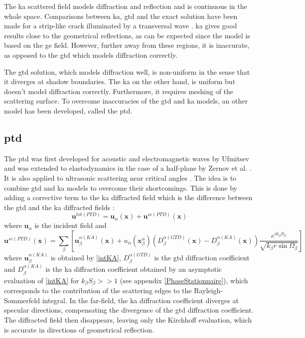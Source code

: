 The \acrshort{ka} scattered field models diffraction and reflection and is continuous in the whole space. Comparisons between \acrshort{ka}, \acrshort{gtd} and the exact solution have been made for a strip-like crack illuminated by a transversal wave \cite{POChapman,systmodel}. \acrshort{ka} gives good results close to the geometrical reflections, as can be expected since the model is based on the \acrshort{ge} field. However, further away from these regions, it is inaccurate, as opposed to the \acrshort{gtd} which models diffraction correctly.

The \acrshort{gtd} solution, which models diffraction well, is non-uniform in the sense that it diverges at shadow boundaries. The \acrshort{ka} on the other hand, is uniform but doesn't model diffraction correctly. Furthermore, it requires meshing of the scattering surface. To overcome inaccuracies of the \acrshort{gtd} and \acrshort{ka} models, an other model has been developed, called the \acrfull{ptd}.

\subsection{\acrfull{ptd}}
The \acrfull{ptd} was first developed for acoustic and electromagnetic waves by Ufmitsev \cite{Ufmi} and was extended to elastodynamics in the case of a half-plane by Zernov et al. \cite{Zernov}. It is also applied to ultrasonic scattering near critical angles \cite{systmodel,FradkinDarmon}. The idea is to combine \acrshort{gtd} and \acrshort{ka} models to overcome their shortcomings. This is done by adding a corrective term to the \acrshort{ka} diffracted field which is the difference between the \acrshort{gtd} and the \acrshort{ka} diffracted fields :
\begin{equation}
\mathbf{u}^{tot (PTD)}=\mathbf{u}_{\alpha}(\mathbf{x})+\mathbf{u}^{sc (PTD)}(\mathbf{x})
\end{equation}
where $\mathbf{u}_{\alpha}$ is the incident field and
\begin{equation}
\mathbf{u}^{sc (PTD)}(\mathbf{x})=\sum_{\beta}\left[\mathbf{u}^{\alpha(KA)}_{\beta}(\mathbf{x})+u_{\alpha}(\mathbf{x}_{\beta}^{\alpha})\left(D_{\beta}^{\alpha(GTD)}(\mathbf{x})-D_{\beta}^{\alpha(KA)}(\mathbf{x})\right)\dfrac{e^{ik_{\beta}S_{\beta}}}{\sqrt{k_{\beta}r\sin\Omega_{\beta}}}\right]
\label{eqPTD}
\end{equation}
where  $\mathbf{u}^{\alpha(KA)}_{\beta}$ is obtained by \eqref{intKA}, $D_{\beta}^{\alpha(GTD)}$ is the \acrshort{gtd} diffraction coefficient and $D_{\beta}^{\alpha(KA)}$ is the \acrshort{ka} diffraction coefficient obtained by an asymptotic evaluation of \eqref{intKA} for $k_{\beta}S_{\beta}>>1$ (see appendix \ref{PhaseStationnaire}), which corresponds to the contribution of the scattering edges to the Rayleigh-Sommerfeld integral. In the far-field, the \acrshort{ka} diffraction coefficient diverges at specular directions, compensating the divergence of the \acrshort{gtd} diffraction coefficient. The diffracted field then disappears, leaving only the Kirchhoff evaluation, which is accurate in directions of geometrical reflection.

